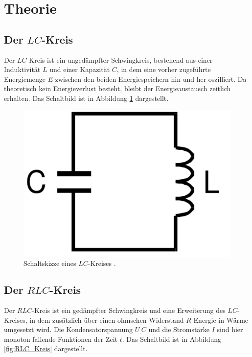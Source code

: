 
\section{Theorie}
\label{sec:Theorie}

\subsection{Der $LC$-Kreis}

Der $LC$-Kreis ist ein ungedämpfter Schwingkreis, bestehend aus einer Induktivität $L$ und einer Kapazität $C$, in dem eine vorher zugeführte Energiemenge $E$ zwischen den beiden Energiespeichern hin und her oszilliert. Da theoretisch kein Energieverlust besteht, bleibt der Energieaustausch zeitlich erhalten. Das Schaltbild ist in Abbildung \ref{fig:LC_Kreis} dargestellt.

\begin{figure}
\centering
\includegraphics[width=\linewidth-300pt,height=\textheight-300pt,keepaspectratio]{content/images/CL.png}
\caption{Schaltskizze eines $LC$-Kreises \cite{V354}.}
\label{fig:LC_Kreis}
\end{figure}
   
\subsection{Der $RLC$-Kreis}

Der $RLC$-Kreis ist ein gedämpfter Schwingkreis und eine Erweiterung des $LC$-Kreises, in dem zusätzlich über einen ohmschen Widerstand $R$ Energie in Wärme umgesetzt wird. Die Kondensatorspannung $U_.C$ und die Stromstärke $I$ sind hier monoton fallende Funktionen der Zeit $t$. Das Schaltbild ist in Abbildung \ref{fig:RLC_Kreis} dargestellt.

